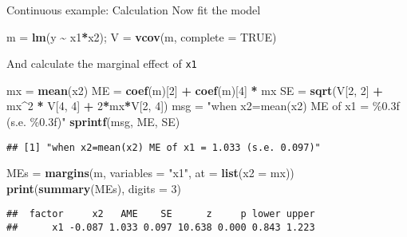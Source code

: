 \documentclass[
  ignorenonframetext,
]{beamer}
\newenvironment{Shaded}{\begin{snugshade}}{\end{snugshade}}
\newcommand{\AttributeTok}[1]{\textcolor[rgb]{0.13,0.29,0.53}{#1}}
\newcommand{\ConstantTok}[1]{\textcolor[rgb]{0.56,0.35,0.01}{#1}}
\newcommand{\DecValTok}[1]{\textcolor[rgb]{0.00,0.00,0.81}{#1}}
\newcommand{\FunctionTok}[1]{\textcolor[rgb]{0.13,0.29,0.53}{\textbf{#1}}}
\newcommand{\NormalTok}[1]{#1}
\newcommand{\OtherTok}[1]{\textcolor[rgb]{0.56,0.35,0.01}{#1}}
\newcommand{\SpecialCharTok}[1]{\textcolor[rgb]{0.81,0.36,0.00}{\textbf{#1}}}
\newcommand{\StringTok}[1]{\textcolor[rgb]{0.31,0.60,0.02}{#1}}
\begin{document}
\begin{frame}[fragile]{Continuous example: Calculation}
\label{continuous-example-calculation}
Now fit the model

\begin{Shaded}
\begin{Highlighting}[]
\NormalTok{m }\OtherTok{=} \FunctionTok{lm}\NormalTok{(y }\SpecialCharTok{\textasciitilde{}}\NormalTok{ x1}\SpecialCharTok{*}\NormalTok{x2); V }\OtherTok{=} \FunctionTok{vcov}\NormalTok{(m, }\AttributeTok{complete =} \ConstantTok{TRUE}\NormalTok{)}
\end{Highlighting}
\end{Shaded}

\pause

And calculate the marginal effect of \texttt{x1}

\begin{Shaded}
\begin{Highlighting}[]
\NormalTok{mx }\OtherTok{=} \FunctionTok{mean}\NormalTok{(x2)}
\NormalTok{ME }\OtherTok{=} \FunctionTok{coef}\NormalTok{(m)[}\DecValTok{2}\NormalTok{] }\SpecialCharTok{+} \FunctionTok{coef}\NormalTok{(m)[}\DecValTok{4}\NormalTok{] }\SpecialCharTok{*}\NormalTok{ mx}
\NormalTok{SE }\OtherTok{=} \FunctionTok{sqrt}\NormalTok{(V[}\DecValTok{2}\NormalTok{, }\DecValTok{2}\NormalTok{] }\SpecialCharTok{+}\NormalTok{ mx}\SpecialCharTok{\^{}}\DecValTok{2} \SpecialCharTok{*}\NormalTok{ V[}\DecValTok{4}\NormalTok{, }\DecValTok{4}\NormalTok{] }\SpecialCharTok{+} \DecValTok{2}\SpecialCharTok{*}\NormalTok{mx}\SpecialCharTok{*}\NormalTok{V[}\DecValTok{2}\NormalTok{, }\DecValTok{4}\NormalTok{])}
\NormalTok{msg }\OtherTok{=} \StringTok{"when x2=mean(x2) ME of x1 = \%0.3f (s.e. \%0.3f)"}
\FunctionTok{sprintf}\NormalTok{(msg, ME, SE)}
\end{Highlighting}
\end{Shaded}

\begin{verbatim}
## [1] "when x2=mean(x2) ME of x1 = 1.033 (s.e. 0.097)"
\end{verbatim}

\begin{Shaded}
\begin{Highlighting}[]
\NormalTok{MEs }\OtherTok{=} \FunctionTok{margins}\NormalTok{(m, }\AttributeTok{variables =} \StringTok{"x1"}\NormalTok{, }\AttributeTok{at =} \FunctionTok{list}\NormalTok{(}\AttributeTok{x2 =}\NormalTok{ mx))}
\FunctionTok{print}\NormalTok{(}\FunctionTok{summary}\NormalTok{(MEs), }\AttributeTok{digits =} \DecValTok{3}\NormalTok{)}
\end{Highlighting}
\end{Shaded}

\begin{verbatim}
##  factor     x2   AME    SE      z     p lower upper
##      x1 -0.087 1.033 0.097 10.638 0.000 0.843 1.223
\end{verbatim}
\end{frame}
\end{document}

